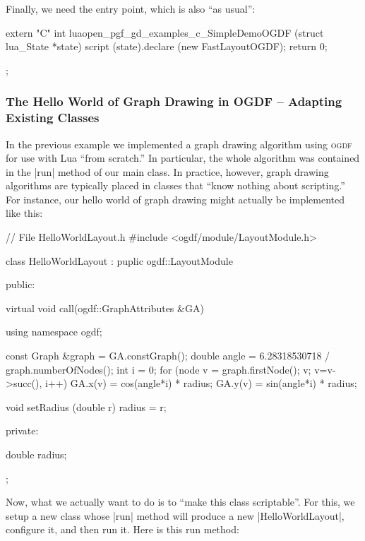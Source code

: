Finally, we need the entry point, which is also ``as usual'':

\begin{codeexample}
extern "C" int luaopen_pgf_gd_examples_c_SimpleDemoOGDF (struct lua_State *state) {
  script (state).declare (new FastLayoutOGDF);
  return 0;
}
\end{codeexample}


\begin{codeexample}[]
\tikz {};
\end{codeexample}

\subsubsection{The Hello World of Graph Drawing in OGDF -- Adapting Existing Classes}

In the previous example we implemented a graph drawing algorithm using
\textsc{ogdf} for use with Lua ``from scratch.'' In particular, the
whole algorithm was contained in the |run| method of our main
class. In practice, however, graph drawing algorithms are typically
placed in classes that ``know nothing about scripting.'' For instance,
our hello world of graph drawing might actually be implemented like this:

\begin{codeexample}
// File HelloWorldLayout.h
#include <ogdf/module/LayoutModule.h>

class HelloWorldLayout : puplic ogdf::LayoutModule {
public:
  
  virtual void call(ogdf::GraphAttributes &GA)
  {
    using namespace ogdf;
    
    const Graph &graph = GA.constGraph();
    double angle  = 6.28318530718 / graph.numberOfNodes();
    int i = 0;
    for (node v = graph.firstNode(); v; v=v->succ(), i++) {
      GA.x(v) = cos(angle*i) * radius;
      GA.y(v) = sin(angle*i) * radius;
    }
  }
  
  void setRadius (double r) { radius = r; }
  
private:

  double radius;
};
\end{codeexample}

Now, what we actually want to do is to ``make this class
scriptable''. For this, we setup a new class whose |run| method will
produce a new |HelloWorldLayout|, configure it, and then run it. Here
is this run method:


